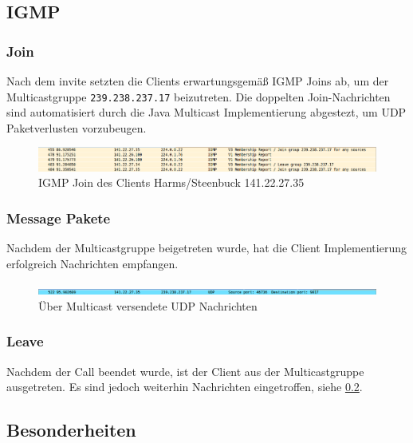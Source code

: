 \documentclass[10pt]{scrartcl}
\begin{document}
\subsection{IGMP}

	\subsubsection{Join}
	Nach dem invite setzten die Clients erwartungsgemäß IGMP Joins ab, um der Multicastgruppe \verb!239.238.237.17! beizutreten. Die doppelten Join-Nachrichten sind automatisiert durch die Java Multicast Implementierung abgestezt, um UDP Paketverlusten vorzubeugen.
	
	\begin{figure}[htb]
        \centering
         \includegraphics[width=\textwidth]{img/join}
         \caption{IGMP Join des Clients Harms/Steenbuck 141.22.27.35}
        \label{img:join}
	\end{figure}	

	
	\subsubsection{Message Pakete}
	Nachdem der Multicastgruppe	beigetreten wurde, hat die Client Implementierung erfolgreich Nachrichten empfangen. 
	
	\begin{figure}[htb]
        \centering
         \includegraphics[width=\textwidth]{img/udpMessage}
         \caption{Über Multicast versendete UDP Nachrichten}
        \label{img:udpMessage}
	\end{figure}	
	
	\subsubsection{Leave}
	Nachdem der Call beendet wurde, ist der Client aus der Multicastgruppe ausgetreten. Es sind jedoch weiterhin Nachrichten eingetroffen, siehe \ref{subsec:besonderheiten}.
	
	
	\subsection{Besonderheiten}\label{subsec:besonderheiten}
	
\end{document}
